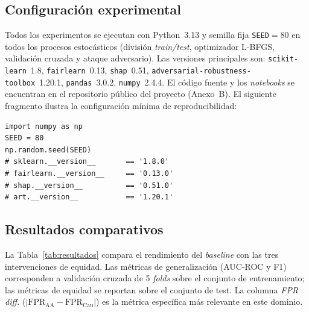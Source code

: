 \documentclass[11pt,a4paper]{article}
\begin{document}
\subsection{Configuración experimental}

Todos los experimentos se ejecutan con Python~3.13 y semilla fija \texttt{SEED}$=80$ en todos los procesos estocásticos (división \textit{train/test}, optimizador L-BFGS, validación cruzada y ataque adversario). Las versiones principales son: \texttt{scikit-learn}~1.8, \texttt{fairlearn}~0.13, \texttt{shap}~0.51, \texttt{adversarial-robustness-toolbox}~1.20.1, \texttt{pandas}~3.0.2, \texttt{numpy}~2.4.4. El código fuente y los \textit{notebooks} se encuentran en el repositorio público del proyecto (Anexo~B). El siguiente fragmento ilustra la configuración mínima de reproducibilidad:

\begin{lstlisting}[caption={Semilla aleatoria y entorno principal.}]
import numpy as np
SEED = 80
np.random.seed(SEED)
# sklearn.__version__       == '1.8.0'
# fairlearn.__version__     == '0.13.0'
# shap.__version__          == '0.51.0'
# art.__version__           == '1.20.1'
\end{lstlisting}

\subsection{Resultados comparativos}

La Tabla~\ref{tab:resultados} compara el rendimiento del \textit{baseline} con las tres intervenciones de equidad. Las métricas de generalización (AUC-ROC y F1) corresponden a validación cruzada de 5 \textit{folds} sobre el conjunto de entrenamiento; las métricas de equidad se reportan sobre el conjunto de test. La columna \textit{FPR diff.} ($|\text{FPR}_{\text{AA}}-\text{FPR}_{\text{Cau}}|$) es la métrica específica más relevante en este dominio.
\end{document}
